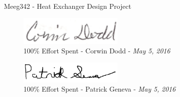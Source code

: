 %
%
\vspace*{20mm}
%
\Huge
\begin{center}
Meeg342 - Heat Exchanger Design Project
\end{center}
\normalsize
%
\vspace{10mm}
%
\begin{figure}[H]
    \centering
    \includegraphics[width=2in]{sigs/sig_cory.png}
    \captionsetup{labelformat=empty}
    \caption{100\% Effort Spent - Corwin Dodd - \textit{May 5, 2016}}
\end{figure}
%
\begin{figure}[H]
    \centering
    \includegraphics[width=2in]{sigs/sig_pat.png}
    \captionsetup{labelformat=empty}
    \caption{100\% Effort Spent - Patrick Geneva - \textit{May 5, 2016}}
\end{figure}


\setcounter{figure}{0}
